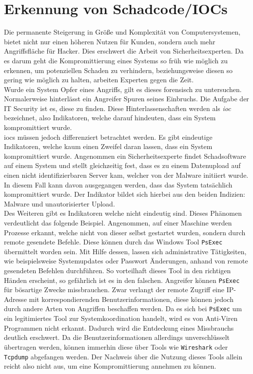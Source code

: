 \documentclass[
    12pt, %
    DIV10,
    ngerman, %
    a4paper, %
    oneside, %
    titlepage, %
    parskip=half, %
    headings=normal, %
    listof=totoc, %
    bibliography=totoc, %
    index=totoc, %
    captions=tableheading, %
    final %
]{scrreprt}
\begin{document}
\chapter{Erkennung von Schadcode/IOCs}\label{sec:ioc}
Die permanente Steigerung in Größe und Komplexität von Computersystemen, bietet nicht nur einen höheren Nutzen für Kunden, sondern auch mehr Angriffsfläche für Hacker. Dies erschwert die Arbeit von Sicherheitsexperten. Da es darum geht die Kompromittierung eines Systems so früh wie möglich zu erkennen, um potenziellen Schaden zu verhindern, beziehungsweise diesen so gering wie möglich zu halten, arbeiten Experten gegen die Zeit.\\
Wurde ein System Opfer eines Angriffs, gilt es dieses forensisch zu untersuchen. Normalerweise hinterlässt ein Angreifer Spuren seines Einbruchs. Die Aufgabe der IT Security ist es, diese zu finden. Diese Hinterlassenschaften werden als \emph{\acf{ioc}} bezeichnet, also Indikatoren, welche darauf hindeuten, dass ein System kompromittiert wurde.\\
%
\ac{iocs} müssen jedoch differenziert betrachtet werden. Es gibt eindeutige Indikatoren, welche kaum einen Zweifel daran lassen, dass ein System kompromittiert wurde. Angenommen ein Sicherheitsexperte findet Schadsoftware auf einem System und stellt gleichzeitig fest, dass es zu einem Datenupload auf einen nicht identifizierbaren Server kam, welcher von der Malware initiiert wurde. In diesem Fall kann davon ausgegangen werden, dass das System tatsächlich kompromittiert wurde. Der Indikator bildet sich hierbei aus den beiden Indizien: Malware und unautorisierter Upload.\\
Des Weiteren gibt es Indikatoren welche nicht eindeutig sind. Dieses Phänomen verdeutlicht das folgende Beispiel. Angenommen, auf einer Maschine werden Prozesse erkannt, welche nicht von dieser selbst gestartet wurden, sondern durch remote gesendete Befehle. Diese können durch das Windows Tool \texttt{PsExec} übermittelt worden sein. Mit Hilfe dessen, lassen sich administrative Tätigkeiten, wie beispielsweise Systemupdates oder Passwort Änderungen, anhand von remote gesendeten Befehlen durchführen. So vorteilhaft dieses Tool in den richtigen Händen erscheint, so gefährlich ist es in den falschen. Angreifer können \texttt{PsExec} für bösartige Zwecke missbrauchen. Zwar verlangt der remote Zugriff eine IP-Adresse mit korrespondierenden Benutzerinformationen, diese können jedoch durch andere Arten von Angriffen beschaffen werden. Da es sich bei \texttt{PsExec} um ein legitimiertes Tool zur Systemkoordination handelt, wird es von Anti-Viren Programmen nicht erkannt. Dadurch wird die Entdeckung eines Missbrauchs deutlich erschwert. Da die Benutzerinformationen allerdings unverschlüsselt übertragen werden, können immerhin diese über Tools wie \texttt{Wireshark} oder \texttt{Tcpdump} abgefangen werden. Der Nachweis über die Nutzung dieses Tools allein reicht also nicht aus, um eine Kompromittierung annehmen zu können.
\end{document}
